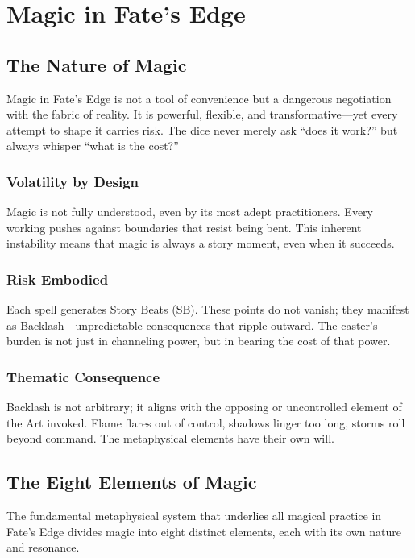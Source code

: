 \documentclass[11pt]{report}
\begin{document}
\chapter{Magic in Fate's Edge}

\section{The Nature of Magic}

Magic in Fate's Edge is not a tool of convenience but a dangerous negotiation with the fabric of reality. It is powerful, flexible, and transformative---yet every attempt to shape it carries risk. The dice never merely ask ``does it work?'' but always whisper ``what is the cost?''

\subsection{Volatility by Design}
Magic is not fully understood, even by its most adept practitioners. Every working pushes against boundaries that resist being bent. This inherent instability means that magic is always a story moment, even when it succeeds.

\subsection{Risk Embodied}
Each spell generates Story Beats (SB). These points do not vanish; they manifest as Backlash---unpredictable consequences that ripple outward. The caster's burden is not just in channeling power, but in bearing the cost of that power.

\subsection{Thematic Consequence}
Backlash is not arbitrary; it aligns with the opposing or uncontrolled element of the Art invoked. Flame flares out of control, shadows linger too long, storms roll beyond command. The metaphysical elements have their own will.

\section{The Eight Elements of Magic}

The fundamental metaphysical system that underlies all magical practice in Fate's Edge divides magic into eight distinct elements, each with its own nature and resonance.
\end{document}
